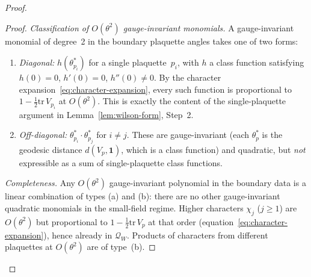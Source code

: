 \documentclass[11pt]{article}
\theoremstyle{definition}
\newcommand{\tr}{\mathrm{tr}}
\begin{document}
\begin{proof}
\begin{proof}
\emph{Classification of $O(\theta^2)$ gauge-invariant
monomials.}  A gauge-invariant monomial of degree~2 in the
boundary plaquette angles takes one of two forms:
\begin{enumerate}[nosep,label=(\alph*)]
\item \emph{Diagonal:} $h(\theta_{p_i}^*)$ for a single
plaquette~$p_i$, with $h$ a class function satisfying
$h(0)=0$, $h'(0)=0$, $h''(0)\ne 0$.  By the character
expansion~\eqref{eq:character-expansion}, every such function is
proportional to $1-\frac{1}{2}\tr\,V_{p_i}$ at $O(\theta^2)$.
This is exactly the content of the single-plaquette argument
in Lemma~\ref{lem:wilson-form}, Step~2.
\item \emph{Off-diagonal:}
$\theta_{p_i}^*\cdot\theta_{p_j}^*$ for $i\ne j$.
These are gauge-invariant (each $\theta_p^*$ is the geodesic
distance $d(V_p,\mathbf{1})$, which is a class function) and
quadratic, but \emph{not} expressible as a sum of
single-plaquette class functions.
\end{enumerate}

\emph{Completeness.}  Any $O(\theta^2)$ gauge-invariant
polynomial in the boundary data is a linear combination of
types (a) and (b): there are no other gauge-invariant
quadratic monomials in the small-field regime.
Higher characters $\chi_j$ ($j\ge 1$) are $O(\theta^2)$ but
proportional to $1-\frac{1}{2}\tr\,V_p$ at that order
(equation~\eqref{eq:character-expansion}), hence already in
$\mathcal{Q}_W$.  Products of characters from different
plaquettes at $O(\theta^2)$ are of type~(b).
\end{proof}


\end{proof}
\end{document}
